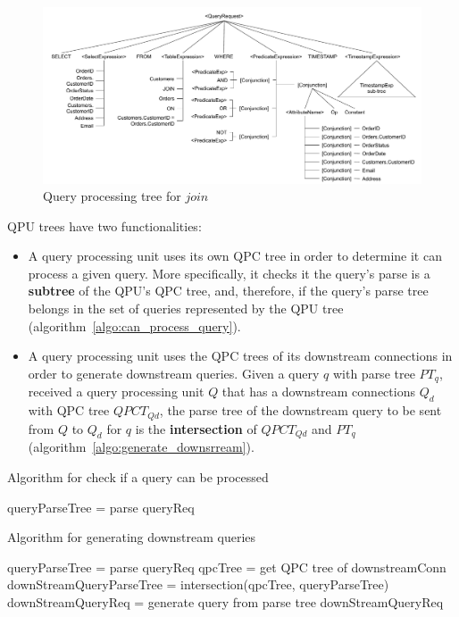 \begin{figure}[t]
  \centering
    \includegraphics[width=\textwidth]{./figures/design_pattern/qpt_join.pdf}
  \caption{Query processing tree for $join$}
  \label{fig:qpt_join}
\end{figure}

QPU trees have two functionalities:
\begin{itemize}
  \item A query processing unit uses its own QPC tree in order to determine it can process a given query.
  More specifically, it checks it the query's parse is a \textbf{subtree} of the QPU's QPC tree,
  and, therefore, if the query's parse tree belongs in the set of queries represented by the QPU tree
  (algorithm~\ref{algo:can_process_query}).

  \item A query processing unit uses the QPC trees of its downstream connections in order to generate downstream queries.
  Given a query $q$ with parse tree $PT_q$, received a query processing unit $Q$ that has a downstream connections $Q_d$
  with QPC tree $QPCT_{Qd}$, the parse tree of the downstream query to be sent from $Q$ to $Q_d$ for $q$ is the
  \textbf{intersection} of $QPCT_{Qd}$ and $PT_q$
  (algorithm~\ref{algo:generate_downsrream}).
\end{itemize}

\begin{algorithm}
\caption{Algorithm for check if a query can be processed}
\label{algo:can_process_query}
\begin{algorithmic}
\State queryParseTree = parse queryReq
\State {}
\EndFunction
\end{algorithmic}
\end{algorithm}

\begin{algorithm}
\caption{Algorithm for generating downstream queries}
\label{algo:generate_downsrream}
\begin{algorithmic}
\State queryParseTree = parse queryReq
\State qpcTree = get QPC tree of downstreamConn
\State downStreamQueryParseTree = intersection(qpcTree, queryParseTree)
\State downStreamQueryReq = generate query from parse tree
\State \Return downStreamQueryReq
\EndFunction
\end{algorithmic}
\end{algorithm}


